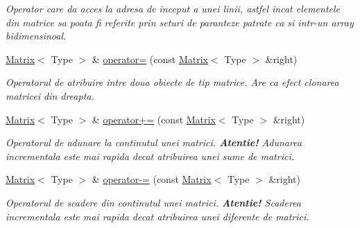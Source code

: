 \begin{DoxyCompactItemize}
\begin{DoxyCompactList}\small\item\em Operator care da acces la adresa de inceput a unei linii, astfel incat elementele din matrice sa poata fi referite prin seturi de paranteze patrate ca si intr-\/un array bidimensinoal. \item\end{DoxyCompactList}\item 
\hyperlink{classMatrix}{Matrix}$<$ Type $>$ \& \hyperlink{classMatrix_a1a1add9519f7b0665d7521d02ec812e8}{operator=} (const \hyperlink{classMatrix}{Matrix}$<$ Type $>$ \&right)
\begin{DoxyCompactList}\small\item\em Operatorul de atribuire intre doua obiecte de tip matrice. Are ca efect clonarea matricei din dreapta. \item\end{DoxyCompactList}\item 
\hyperlink{classMatrix}{Matrix}$<$ Type $>$ \& \hyperlink{classMatrix_ad1b43be070f29d447bd56e46faa533aa}{operator+=} (const \hyperlink{classMatrix}{Matrix}$<$ Type $>$ \&right)
\begin{DoxyCompactList}\small\item\em Operatorul de adunare la continutul unei matrici. {\bfseries Atentie!} Adunarea incrementala este mai rapida decat atribuirea unei sume de matrici. \item\end{DoxyCompactList}\item 
\hyperlink{classMatrix}{Matrix}$<$ Type $>$ \& \hyperlink{classMatrix_a3f8b8cab5fccc81ec96be09dce471f6c}{operator-\/=} (const \hyperlink{classMatrix}{Matrix}$<$ Type $>$ \&right)
\begin{DoxyCompactList}\small\item\em Operatorul de scadere din continutul unei matrici. {\bfseries Atentie!} Scaderea incrementala este mai rapida decat atribuirea unei diferente de matrici. \item\end{DoxyCompactList}\end{DoxyCompactItemize}
